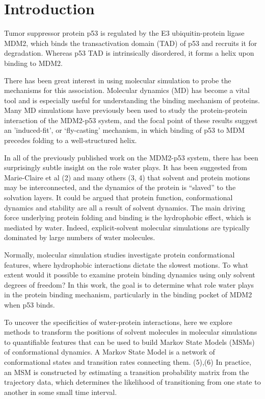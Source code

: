 
\section{Introduction}


Tumor suppressor protein p53 is regulated by the E3 ubiquitin-protein
ligase MDM2, which binds the transactivation domain (TAD) of p53 and
recruits it for degradation. Whereas p53 TAD is intrinsically
disordered, it forms a helix upon binding to MDM2.

There has been great interest in using molecular simulation to probe the
mechanisms for this association. Molecular dynamics (MD) has become a
vital tool and is especially useful for understanding the binding
mechanism of proteins. Many MD simulations have previously been used to
study the protein-protein interaction of the MDM2-p53 system, and the
focal point of these results suggest an 'induced-fit', or `fly-casting'
mechanism, in which binding of p53 to MDM precedes folding to a
well-structured helix.

In all of the previously published work on the MDM2-p53 system, there
has been surprisingly subtle insight on the role water plays. It has
been suggested from Marie-Claire et al (2) and many others (3, 4) that
solvent and protein motions may be interconnected, and the dynamics of
the protein is ``slaved'' to the solvation layers. It could be argued
that protein function, conformational dynamics and stability are all a
result of solvent dynamics. The main driving force underlying protein
folding and binding is the hydrophobic effect, which is mediated by
water. Indeed, explicit-solvent molecular simulations are typically
dominated by large numbers of water molecules.

Normally, molecular simulation studies investigate protein
conformational features, where hydrophobic interactions dictate the
slowest motions. To what extent would it possible to examine protein
binding dynamics using only solvent degrees of freedom? In this work,
the goal is to determine what role water plays in the protein binding
mechanism, particularly in the binding pocket of MDM2 when p53 binds.

To uncover the specificities of water-protein interactions, here we
explore methods to transform the positions of solvent molecules in
molecular simulations to quantifiable features that can be used to build
Markov State Models (MSMs) of conformational dynamics. A Markov State
Model is a network of conformational states and transition rates
connecting them. (5),(6) In practice, an MSM is constructed by
estimating a transition probability matrix from the trajectory data,
which determines the likelihood of transitioning from one state to
another in some small time interval.


